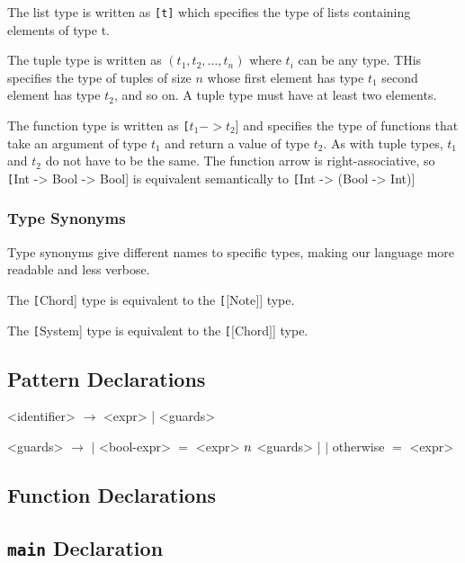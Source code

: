 The list type is written as \texttt{[t]} which specifies the type of lists
containing elements of type t.

The tuple type is written as \texttt{$(t_1, t_2, \ldots, t_n)$} where $t_i$
can be any type. THis specifies the type of tuples of size $n$ whose first
element has type $t_1$ second element has type $t_2$, and so on. A tuple
type must have at least two elements.

The function type is written as \texttt[$t_1 -> t_2$] and specifies the type
of functions that take an argument of type $t_1$ and return a value of type
$t_2$. As with tuple types, $t_1$ and $t_2$ do not have to be the same.
The function arrow is right-associative, so \texttt[Int -> Bool -> Bool] is
equivalent semantically to \texttt[Int -> (Bool -> Int)]

\subsubsection{Type Synonyms}

Type synonyms give different names to specific types, making our language
more readable and less verbose.

The \texttt[Chord] type is equivalent to the \texttt[$[$Note$]$] type.

The \texttt[System] type is equivalent to the \texttt[$[$Chord$]$] type.

\subsection{Pattern Declarations}

\begin{grammar}

<identifier> $\rightarrow$ <expr> | <guards>

<guards> $\rightarrow$ $|$ <bool-expr> $=$ <expr> $\\n$ <guards> |
											 $|$	otherwise $=$ <expr>
\end{grammar}

\subsection{Function Declarations}

\subsection{\texttt{main} Declaration}
